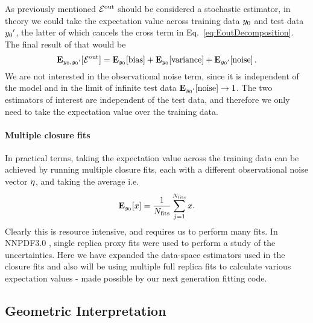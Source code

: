 As previously mentioned $\mathcal{E}^{\rm out}$ should be considered a stochastic estimator, in
theory we could take the expectation value across training data $y_0$ and
test data ${{y_0}^{\prime}}$, the latter of which cancels the cross term in
Eq.~\ref{eq:EoutDecomposition}. The final result of that would be
\begin{equation}\label{eq:ExpectedBiasVariance}
    \mathbf{E}_{y_0, {{y_0}^{\prime}}}[\mathcal{E}^{\rm out}] =
    \mathbf{E}_{y_0}[{\rm bias}] + 
    \mathbf{E}_{y_0}[{\rm variance}] +
    \mathbf{E}_{{{y_0}^{\prime}}}[{\rm noise}]\, .
\end{equation}
We are not interested in the observational noise term, since it is
independent of the model and in the limit of infinite test data
$\mathbf{E}_{{{y_0}^{\prime}}}[{\rm noise}] \to 1$.
The two estimators of interest are independent of
the test data, and therefore we only need to take the expectation value over
the training data.

\paragraph{Multiple closure fits}
In practical terms, taking the expectation value across the training data can
be achieved by running multiple closure fits, each with a different
observational noise vector $\eta$, and taking the average i.e.
\begin{equation}
    \mathbf{E}_{y_0}[ x ] = \frac{1}{N_{\rm fits}} \sum_{j=1}^{N_{\rm fits}} x.
\end{equation}
Clearly this is resource intensive, and requires us to perform many fits. In
NNPDF3.0 \cite{nnpdf30}, single replica proxy fits were used to perform a study
of the uncertainties. Here we have expanded the data-space estimators used in
the closure fits and also will be using multiple full replica fits to
calculate various expectation values - made possible by our next generation
fitting code.

\subsection{Geometric Interpretation}

